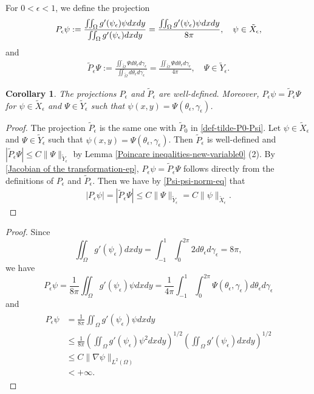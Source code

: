 \documentclass[1 [leqno, 11pt]{amsart}
\numberwithin{equation}{section}
\let\ep=\epsilon
\newtheorem{Corollary}[Theorem]{Corollary}
\begin{document}
\begin{CJK*}{GBK}{song}
For $0<\epsilon<1$, we define the projection
\begin{align}\label{P-ep}P_\ep \psi := \frac{\iint_\Omega g'(\psi_\ep)\psi dxdy}{\iint_\Omega g'(\psi_\ep) dxdy}={\iint_\Omega g'(\psi_\ep)\psi dxdy\over8\pi},\quad\psi \in \tilde{X}_\ep,\end{align}
 and
\begin{align}\label{P-ep-new-variables}
\tilde P_\ep\Psi :=\frac{\iint_{\tilde \Omega}  \Psi d \theta_\ep d \gamma_\ep}{\iint_{\tilde \Omega}   d \theta_\ep d \gamma_\ep}= \frac{\iint_{\tilde \Omega}  \Psi d \theta_\ep d \gamma_\ep}{4\pi},\quad \Psi \in \tilde{Y}_\ep.\end{align}

\begin{Corollary}\label{P-welldefined}
The projections $P_\ep $
 and
$\tilde P_\ep$ are well-defined. Moreover,
$P_\ep \psi = \tilde P_\ep\Psi$
for  $\psi \in \tilde{X}_\ep$ and $\Psi \in \tilde{Y}_\ep$ such that $\psi(x,y) = \Psi(\theta_\ep, \gamma_\ep)$.
\end{Corollary}
\begin{proof}
The projection $\tilde P_\ep$ is the same one with  $\tilde P_0$ in \eqref{def-tilde-P0-Psi}. Let $\psi \in \tilde{X}_\ep$ and $\Psi \in \tilde{Y}_\ep$ such that $\psi(x,y) = \Psi(\theta_\ep, \gamma_\ep)$. Then $\tilde P_\ep$ is well-defined and $|\tilde P_\epsilon\Psi|\leq C \|\Psi\|_{\tilde Y_\epsilon}$ by Lemma
\ref{Poincare ineqalities-new-variable0} (2).
By \eqref{Jacobian of the transformation-ep},  $P_\ep \psi = \tilde P_\ep\Psi$ follows directly from  the definitions of $P_\ep$ and $\tilde P_\ep$. Then we have by \eqref{Psi-psi-norm-eq} that
\begin{align}\label{projection-controlled by-X-ep}
|P_\epsilon\psi|=|\tilde P_\epsilon\Psi|\leq C \|\Psi\|_{\tilde Y_\epsilon}=C \| \psi\|_{\tilde X_\epsilon}.
\end{align}
\end{proof}

\begin{proof}
Since $$\iint_\Omega g'(\psi_\ep) dxdy = \int_{-1}^{1} \int_0^{2\pi} 2 d\theta_\ep d \gamma_\ep = 8\pi,$$
we have
$$P_\ep \psi = \frac{1}{8\pi} \iint_\Omega g'(\psi_\ep)\psi dxdy = \frac{1}{4\pi}\int_{-1}^1 \int_{0}^{2\pi} \Psi(\theta_\ep, \gamma_\ep) d \theta_\ep d \gamma_\ep$$
and
\begin{align}\label{Pep}
\begin{split}
P_\ep \psi
& = \frac{1}{8\pi} \iint_\Omega g'(\psi_\ep)\psi dxdy\\
& \leq \frac{1}{8\pi} \left(\iint_\Omega g'(\psi_\ep)\psi^2 dxdy\right)^{1/2} \left( \iint_\Omega g'(\psi_\ep)dxdy \right)^{1/2} \\
& \leq C \|\nabla \psi\|_{L^2(\Omega)} \\
& < + \infty.
\end{split}
\end{align}
\end{proof}
\fi


\end{CJK*}
\end{document}
